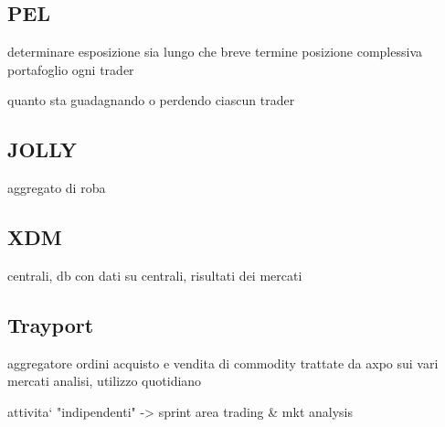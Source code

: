 \subsection{PEL}
    determinare esposizione sia lungo che breve termine 
    posizione complessiva portafoglio ogni trader
    
    quanto sta guadagnando o perdendo ciascun trader
\subsection{JOLLY}
    aggregato di roba
\subsection{XDM}
    centrali, db con dati su centrali, risultati dei mercati
\subsection{Trayport}
    aggregatore ordini acquisto e vendita di commodity trattate da axpo sui vari mercati
    analisi, utilizzo quotidiano
    
    
    
    
    
attivita` "indipendenti" -> sprint
    area trading \& mkt analysis